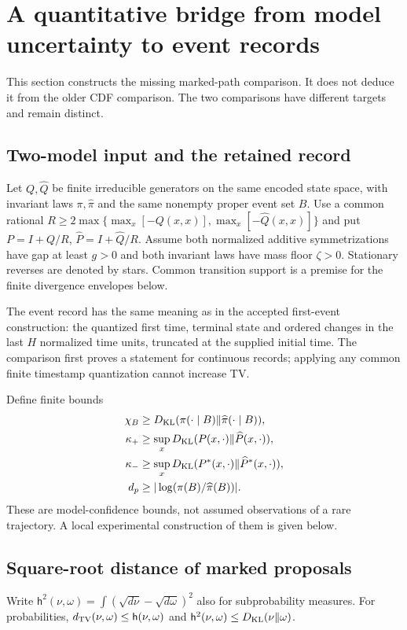 \section{A quantitative bridge from model uncertainty to event records}
\label{sec:bridge}

This section constructs the missing marked-path comparison. It does not
deduce it from the older CDF comparison. The two comparisons have different
targets and remain distinct.

\subsection{Two-model input and the retained record}
Let $Q,\widehat Q$ be finite irreducible generators on the same encoded
state space, with invariant laws $\pi,\widehat\pi$ and the same nonempty
proper event set $B$. Use a common rational
$R\ge2\max\{\max_x[-Q(x,x)],\max_x[-\widehat Q(x,x)]\}$ and put
$P=I+Q/R$, $\widehat P=I+\widehat Q/R$.
Assume both normalized additive symmetrizations have gap at least $g>0$
and both invariant laws have mass floor $\zeta>0$.
Stationary reverses are denoted by stars. Common transition support is a
premise for the finite divergence envelopes below.

The event record has the same meaning as in the accepted first-event
construction: the quantized first time, terminal state and ordered changes
in the last $H$ normalized time units, truncated at the supplied initial
time. The comparison first proves a statement for continuous records;
applying any common finite timestamp quantization cannot increase TV.

Define finite bounds
\begin{align}
\chi_B&\ge D_{\rm KL}(\pi(\cdot\mid B)\Vert\widehat\pi(\cdot\mid B)),\\
\kappa_+&\ge\sup_xD_{\rm KL}(P(x,\cdot)\Vert\widehat P(x,\cdot)),\\
\kappa_-&\ge\sup_xD_{\rm KL}(P^*(x,\cdot)\Vert\widehat P^*(x,\cdot)),\\
d_p&\ge|\log(\pi(B)/\widehat\pi(B))|.
\end{align}
These are model-confidence bounds, not assumed observations of a rare
trajectory. A local experimental construction of them is given below.

\subsection{Square-root distance of marked proposals}
Write
$\mathsf h^2(\nu,\omega)=\int(\sqrt{d\nu}-\sqrt{d\omega})^2$
also for subprobability measures. For probabilities,
$d_{\rm TV}(\nu,\omega)\le\mathsf h(\nu,\omega)$ and
$\mathsf h^2(\nu,\omega)\le D_{\rm KL}(\nu\Vert\omega)$.

